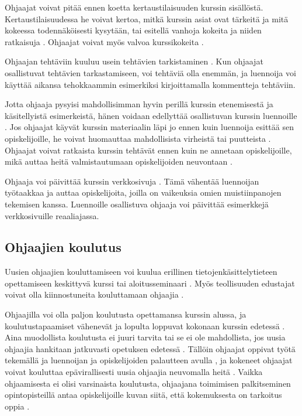 \documentclass[finnish]{tktltiki2}
\theoremstyle{definition}
\theoremstyle{remark}
\begin{document}
Ohjaajat voivat pitää ennen koetta kertaustilaisuuden kurssin sisällöstä. Kertaustilaisuudessa he voivat kertoa, mitkä kurssin asiat ovat tärkeitä ja mitä kokeessa todennäköisesti kysytään, tai esitellä vanhoja kokeita ja niiden ratkaisuja \cite{Decker06}. Ohjaajat voivat myös valvoa kurssikokeita \cite{Richards00}. \par

Ohjaajan tehtäviin kuuluu usein tehtävien tarkistaminen \cite{Dickson11}. Kun ohjaajat osallistuvat tehtävien tarkastamiseen, voi tehtäviä olla enemmän, ja luennoija voi käyttää aikansa tehokkaammin esimerkiksi kirjoittamalla kommentteja tehtäviin. \par

Jotta ohjaaja pysyisi mahdollisimman hyvin perillä kurssin etenemisestä ja käsitellyistä esimerkeistä, hänen voidaan edellyttää osallistuvan kurssin luennoille \cite{Reges03, Decker06}. Jos ohjaajat käyvät kurssin materiaalin läpi jo ennen kuin luennoija esittää sen opiskelijoille, he voivat huomauttaa mahdollisista virheistä tai puutteista \cite{Vikberg}. Ohjaajat voivat ratkaista kurssin tehtävät ennen kuin ne annetaan opiskelijoille, mikä auttaa heitä valmistautumaan opiskelijoiden neuvontaan \cite{Vihavainen}. \par

Ohjaaja voi päivittää kurssin verkkosivuja \cite{Dickson11}. Tämä vähentää luennoijan työtaakkaa ja auttaa opiskelijoita, joilla on vaikeuksia omien muistiinpanojen tekemisen kanssa. Luennoille osallistuva ohjaaja voi päivittää esimerkkejä verkkosivuille reaaliajassa. \par





\subsection{Ohjaajien koulutus}

Uusien ohjaajien kouluttamiseen voi kuulua erillinen tietojenkäsittelytieteen opettamiseen keskittyvä kurssi \cite{Reges88, Roberts95} tai aloitusseminaari \cite{Sperry08}. Myös teollisuuden edustajat voivat olla kiinnostuneita kouluttamaan ohjaajia \cite{Morgan02}. \par

Ohjaajilla voi olla paljon koulutusta opettamansa kurssin alussa, ja koulutustapaamiset vähenevät ja lopulta loppuvat kokonaan kurssin edetessä \cite{Roberts95}. Aina muodollista koulutusta ei juuri tarvita tai se ei ole mahdollista, jos uusia ohjaajia hankitaan jatkuvasti opetuksen edetessä \cite{Kurhila11}. Tällöin ohjaajat oppivat työtä tekemällä ja luennoijan ja opiskelijoiden palautteen avulla \cite{Shannon98, Vihavainen}, ja kokeneet ohjaajat voivat kouluttaa epävirallisesti uusia ohjaajia neuvomalla heitä \cite{Kurhila11}. Vaikka ohjaamisesta ei olisi varsinaista koulutusta, ohjaajana toimimisen palkitseminen opintopisteillä antaa opiskelijoille kuvan siitä, että kokemuksesta on tarkoitus oppia \cite{Vikberg}. \par
\end{document}
